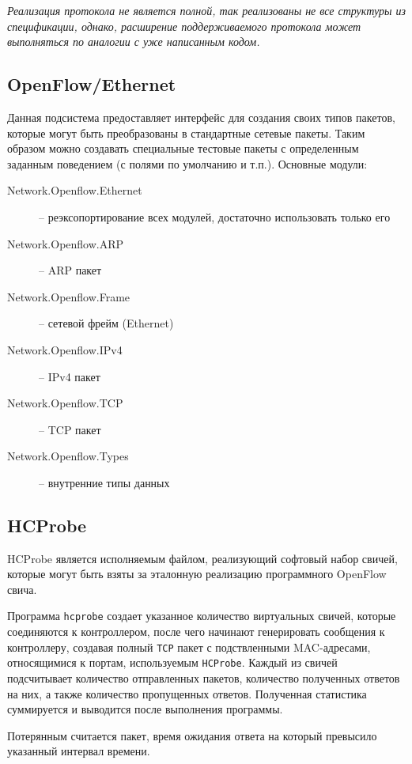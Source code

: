 \documentclass[9pt,a4paper]{article}
\begin{document}
\emph{Реализация протокола не является полной, так реализованы не все структуры из
спецификации, однако, расширение поддерживаемого протокола может выполняться по аналогии с
уже написанным кодом.}

\subsection{OpenFlow/Ethernet}

Данная подсистема предоставляет интерфейс для создания своих типов пакетов, 
которые могут быть преобразованы в стандартные сетевые пакеты. Таким образом можно создавать
специальные тестовые пакеты с определенным заданным поведением (с полями по умолчанию и т.п.).
Основные модули:

\begin{description}
  \item[Network.Openflow.Ethernet] -- реэксопортирование всех модулей, достаточно использовать только его
  \item[Network.Openflow.ARP]      -- ARP пакет
  \item[Network.Openflow.Frame]    -- сетевой фрейм (Ethernet)
  \item[Network.Openflow.IPv4]     -- IPv4 пакет
  \item[Network.Openflow.TCP]      -- TCP пакет
  \item[Network.Openflow.Types]    -- внутренние типы данных
\end{description}

\subsection{HCProbe}

HCProbe является исполняемым файлом, реализующий софтовый набор свичей, которые могут
быть взяты за эталонную реализацию программного OpenFlow свича.

Программа \texttt{hcprobe} создает указанное количество виртуальных свичей,
которые соединяются к контроллером, после чего начинают генерировать сообщения
к контроллеру, создавая полный \texttt{TCP} пакет с подствленными MAC-адресами,
относящимися к портам, используемым \texttt{HCProbe}. Каждый из свичей 
подсчитывает количество отправленных пакетов, количество полученных ответов на них,
а также количество пропущенных ответов. Полученная статистика суммируется и выводится
после выполнения программы.

Потерянным считается пакет, время ожидания ответа на который превысило указанный
интервал времени.
\end{document}
